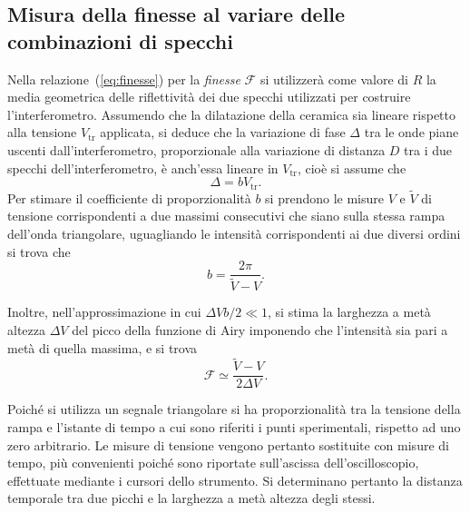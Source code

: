 \documentclass[10pt,oneside,a4paper]{article}
\begin{document}
\begin{multicols}{2}
\section{Misura della finesse al variare delle combinazioni di specchi}
Nella relazione~(\ref{eq:finesse}) per la \emph{finesse} $\mathcal{F}$ si utilizzerà come valore di $R$ la media geometrica delle riflettività dei due specchi utilizzati per costruire l'interferometro. Assumendo che la dilatazione della ceramica sia lineare rispetto alla tensione $V_\text{tr}$ applicata, si deduce che la variazione di fase $\Delta$ tra le onde piane uscenti dall'interferometro, proporzionale alla variazione di distanza $D$ tra i due specchi dell'interferometro, è anch'essa lineare in $V_\text{tr}$, cioè si assume che
\[
	\Delta = b V_\text{tr}.
\]
Per stimare il coefficiente di proporzionalità $b$ si prendono le misure $V$ e $\tilde{V}$ di tensione corrispondenti a due massimi consecutivi che siano sulla stessa rampa dell'onda triangolare, uguagliando le intensità corrispondenti ai due diversi ordini si trova che
\begin{equation}\label{eq:b}
	b=\frac{2\pi}{\tilde{V}-V}.
\end{equation}

Inoltre, nell'approssimazione in cui ${\Delta V b/ 2 \ll 1}$, si stima la larghezza a metà altezza $\Delta V$ del picco della funzione di Airy imponendo che l'intensità sia pari a metà di quella massima, e si trova
\begin{equation}\label{eq:F_approx}
	\mathcal{F} \simeq \frac{\tilde{V} - V}{2 \Delta V}.
\end{equation}

Poiché si utilizza un segnale triangolare si ha proporzionalità tra la tensione della rampa e l'istante di tempo a cui sono riferiti i punti sperimentali, rispetto ad uno zero arbitrario. Le misure di tensione vengono pertanto sostituite con misure di tempo, più convenienti poiché sono riportate sull'ascissa dell'oscilloscopio, effettuate mediante i cursori dello strumento. Si determinano pertanto la distanza temporale tra due picchi e la larghezza a metà altezza degli stessi.
 

\end{multicols}
\end{document}
